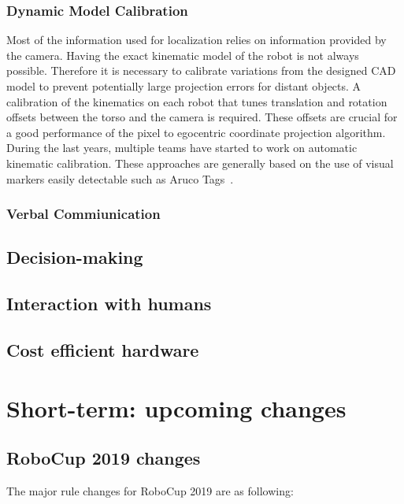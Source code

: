 \documentclass{article}
\begin{document}
\subsubsection{Dynamic Model Calibration}
Most of the information used for localization relies on information provided by the camera. 
Having the exact kinematic model of the robot is not always possible. 
Therefore it is necessary to calibrate variations from the designed CAD model to prevent potentially large projection errors for distant objects. 
A calibration of the kinematics on each robot that tunes translation and rotation offsets between the torso and the camera is required. 
These offsets are crucial for a good performance of the pixel to egocentric coordinate projection algorithm.
During the last years, multiple teams have started to work on automatic kinematic calibration. 
These approaches are generally based on the use of visual markers easily detectable such as Aruco Tags~\cite{Garrido-Jurado2014}.

\subsubsection{Verbal Commiunication}


\subsection{Decision-making}

\subsection{Interaction with humans}

\subsection{Cost efficient hardware}

\section{\label{sec:ShortTerm}Short-term: upcoming changes}

\subsection{RoboCup 2019 changes}

The major rule changes for RoboCup 2019 are as following:
\end{document}
